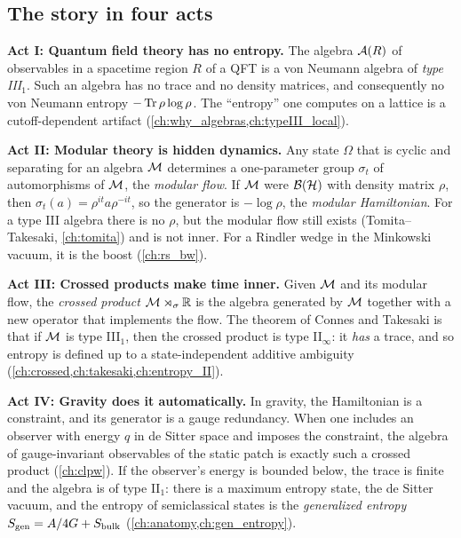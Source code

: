 \subsection{The story in four acts}

\textbf{Act I: Quantum field theory has no entropy.} The algebra $\mathcal{A}(R)$ of observables in a spacetime region $R$ of a QFT is a von Neumann algebra of \emph{type III$_1$}. Such an algebra has no trace and no density matrices, and consequently no von Neumann entropy $-\operatorname{Tr}\rho\log\rho$. The ``entropy'' one computes on a lattice is a cutoff-dependent artifact (\cref{ch:why_algebras,ch:typeIII_local}).

\textbf{Act II: Modular theory is hidden dynamics.} Any state $\Omega$ that is cyclic and separating for an algebra $\mathcal{M}$ determines a one-parameter group $\sigma_t$ of automorphisms of $\mathcal{M}$, the \emph{modular flow}. If $\mathcal{M}$ were $\mathcal{B}(\mathcal{H})$ with density matrix $\rho$, then $\sigma_t(a)=\rho^{it}a\rho^{-it}$, so the generator is $-\log\rho$, the \emph{modular Hamiltonian}. For a type III algebra there is no $\rho$, but the modular flow still exists (Tomita--Takesaki, \cref{ch:tomita}) and is not inner. For a Rindler wedge in the Minkowski vacuum, it is the boost (\cref{ch:rs_bw}).

\textbf{Act III: Crossed products make time inner.} Given $\mathcal{M}$ and its modular flow, the \emph{crossed product} $\mathcal{M}\rtimes_\sigma\mathbb{R}$ is the algebra generated by $\mathcal{M}$ together with a new operator that implements the flow. The theorem of Connes and Takesaki is that if $\mathcal{M}$ is type III$_1$, then the crossed product is type II$_\infty$: it \emph{has} a trace, and so entropy is defined up to a state-independent additive ambiguity (\cref{ch:crossed,ch:takesaki,ch:entropy_II}).

\textbf{Act IV: Gravity does it automatically.} In gravity, the Hamiltonian is a constraint, and its generator is a gauge redundancy. When one includes an observer with energy $q$ in de Sitter space and imposes the constraint, the algebra of gauge-invariant observables of the static patch is exactly such a crossed product (\cref{ch:clpw}). If the observer's energy is bounded below, the trace is finite and the algebra is of type II$_1$: there is a maximum entropy state, the de Sitter vacuum, and the entropy of semiclassical states is the \emph{generalized entropy} $S_{\mathrm{gen}}=A/4G+S_{\rm bulk}$ (\cref{ch:anatomy,ch:gen_entropy}).

